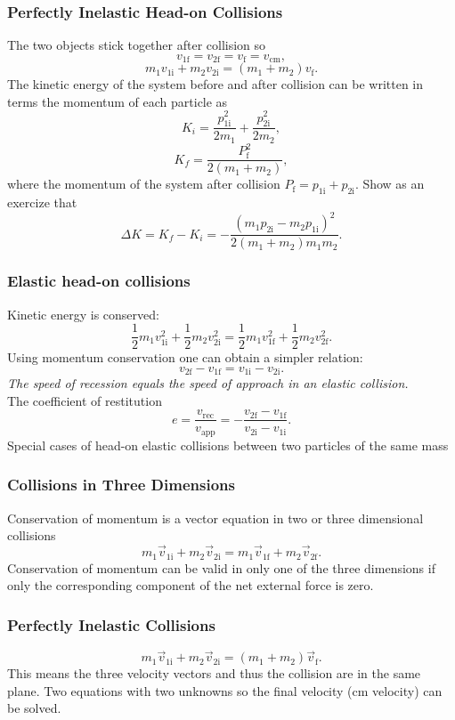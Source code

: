 \documentclass{beamer}
\begin{document}
\begin{frame}
\frametitle{Perfectly Inelastic Head-on Collisions}
The two objects stick together after collision so $$v_{1\mathrm{f}} = v_{2\mathrm{f}} = v_\mathrm{f} = v_\mathrm{cm},$$ $$m_1 v_{1\mathrm{i}} + m_2 v_{2\mathrm{i}} = \left(m_1 + m_2\right) v_\mathrm{f}.$$
The kinetic energy of the system before and after collision can be written in terms the momentum of each particle as $$K_i = \frac{p_{1\mathrm{i}}^2}{2m_1} + \frac{p_{2\mathrm{i}}^2}{2m_2},$$ $$K_f = \frac{P_\mathrm{f}^2}{2\left(m_1 + m_2\right)},$$ where the momentum of the system after collision $P_\mathrm{f} = p_{1\mathrm{i}} + p_{2\mathrm{i}}$. Show as an exercize that $$\Delta{K} = K_f - K_i = -\frac{\left(m_1 p_{2\mathrm{i}} - m_2 p_{1\mathrm{i}}\right)^2}{2\left(m_1 + m_2\right) m_1 m_2}.$$
\end{frame}

\begin{frame}
\frametitle{Elastic head-on collisions}
Kinetic energy is conserved: $$\frac{1}{2} m_1 v_{1\mathrm{i}}^2 + \frac{1}{2} m_2 v_{2\mathrm{i}}^2 = \frac{1}{2} m_1 v_{1\mathrm{f}}^2 + \frac{1}{2} m_2 v_{2\mathrm{f}}^2.$$
Using momentum conservation one can obtain a simpler relation: $$v_{2\mathrm{f}} - v_{1\mathrm{f}} = v_{1\mathrm{i}} - v_{2\mathrm{i}}.$$
\textit{The speed of recession equals the speed of approach in an elastic collision.}
\\The coefficient of restitution $$e = \frac{v_\mathrm{rec}}{v_\mathrm{app}} = -\frac{v_{2\mathrm{f}} - v_{1\mathrm{f}}}{v_{2\mathrm{i}} - v_{1\mathrm{i}}}.$$
Special cases of head-on elastic collisions between two particles of the same mass
\end{frame}

\begin{frame}
\frametitle{Collisions in Three Dimensions}
Conservation of momentum is a vector equation in two or three dimensional collisions $$m_1 \vec{v}_{1\mathrm{i}} + m_2 \vec{v}_{2\mathrm{i}} = m_1 \vec{v}_{1\mathrm{f}} + m_2 \vec{v}_{2\mathrm{f}}.$$
Conservation of momentum can be valid in only one of the three dimensions if only the corresponding component of the net external force is zero.
\end{frame}

\begin{frame}
\frametitle{Perfectly Inelastic Collisions}
$$m_1 \vec{v}_{1\mathrm{i}} + m_2 \vec{v}_{2\mathrm{i}} = \left(m_1 + m_2\right) \vec{v}_\mathrm{f}.$$
This means the three velocity vectors and thus the collision are in the same plane. Two equations with two unknowns so the final velocity (cm velocity) can be solved.
\end{frame}
\end{document}

